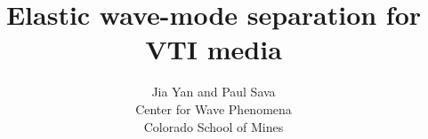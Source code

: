 \title{Elastic wave-mode separation for VTI media}
\author{Jia Yan and Paul Sava \\ 
Center for Wave Phenomena \\ 
Colorado School of Mines}

\maketitle







     
 
        
     
   
  




